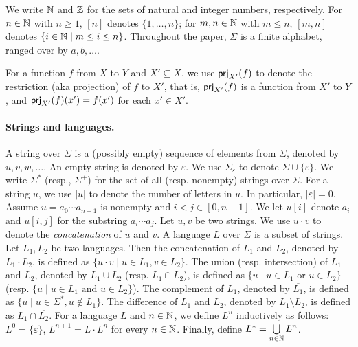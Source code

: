 %

We write $\mathbb{N}$ and $\mathbb{Z}$ for the sets of natural and integer numbers, respectively. For $n \in \mathbb{N}$ with $n \ge 1$, $[n]$ denotes $\{1, \ldots, n\}$; for $m,n \in \mathbb{N}$ with $m \le n$,  $[m, n]$ denotes $\{ i \in \mathbb{N} \mid m \le i \le n \}$. Throughout the paper, $\Sigma$ is a finite alphabet, ranged over by $a,b,\ldots$.  

For a function $f$ from $X$ to $Y$ and $X' \subseteq X$, we use ${\sf prj}_{X'}(f)$ to denote the restriction (aka projection) of $f$ to $X'$, that is, ${\sf prj}_{X'}(f)$ is a function from $X'$ to $Y$, and ${\sf prj}_{X'}(f)(x') = f(x')$ for each $x' \in X'$.

\paragraph*{Strings and languages.}
A string over $\Sigma$ is a (possibly empty) sequence of elements from $\Sigma$,
denoted by $u, v, w, \ldots$. An empty string is denoted by $\varepsilon$. We use $\Sigma_\varepsilon$ to denote $\Sigma \cup \{\varepsilon\}$. We write $\Sigma^*$ (resp., $\Sigma^+$) for the set of all (resp. nonempty) strings over $\Sigma$.
For a string $u$, we use $|u|$ to denote the number of letters in $u$. In particular, $|\varepsilon|=0$. 
Assume $u=a_0\cdots a_{n-1}$ is nonempty and $i<j \in [0,n-1]$. %
We let $u[i]$ denote $a_i$ and $u[i,j]$ for the substring %
$a_i\cdots a_j$. 
%
Let $u, v$ be two strings. We use $u \cdot v$ to denote the \emph{concatenation} of $u$ and $v$. A language $L$ over $\Sigma$ is a subset of strings.  
Let $L_1, L_2$ be two languages. Then the concatenation of $L_1$ and $L_2$, denoted by $L_1 \cdot L_2$,  is defined as $\{u \cdot v \mid u \in L_1, v \in L_2\}$. The union (resp. intersection) of $L_1$ and $L_2$, denoted by $L_1 \cup L_2$  (resp. $L_1 \cap L_2$), is defined as $\{u \mid u \in L_1 \mbox{ or } u \in L_2\}$ (resp. $\{u \mid u \in L_1 \mbox{ and } u \in L_2\}$). The complement of $L_1$, denoted by $\overline{L_1}$, is defined as $\{u \mid u \in \Sigma^*, u \not \in L_1\}$. 
The difference of $L_1$ and $L_2$, denoted by $L_1 \setminus L_2$, is defined as $L_1 \cap \overline{L_2}$. 
For a language $L$ and $n \in \mathbb{N}$, we define $L^n$ inductively as follows: $L^0= \{\varepsilon\}$, $L^{n+1} = L \cdot L^n$ for every $n \in \mathbb{N}$. 
Finally, define $L^* = \bigcup \limits_{n \in \mathbb{N}} L^n$.

